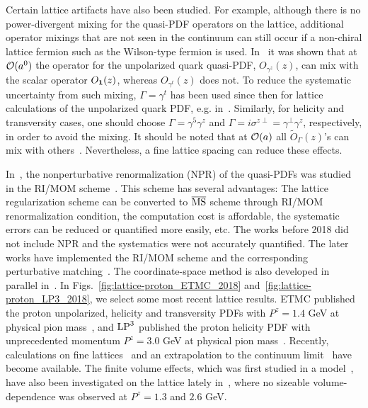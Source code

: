 \documentclass[aps,rmp,reprint,amsmath,amssymb,graphicx,longbibliography]{revtex4-1} %
\begin{document}
Certain lattice artifacts have also been studied. For example, although there is no power-divergent mixing for the quasi-PDF operators on the lattice, additional operator mixings that are not seen in the continuum can still occur if a non-chiral lattice fermion such as the Wilson-type fermion is used.
%
In~\cite{Constantinou:2017sej,Chen:2017mie} it was shown that at ${\cal O}(a^0)$ the operator for the unpolarized quark quasi-PDF, $O_{\gamma^z}(z)$, can mix with the scalar operator $O_{\bf 1}(z)$, whereas $O_{\gamma^t}(z)$ does not.
%
To reduce the systematic uncertainty from such mixing, $\Gamma=\gamma^t$ has been used since then for lattice calculations of the unpolarized quark PDF, e.g. in~\cite{Alexandrou:2017huk,Green:2017xeu,Chen:2017mzz}. Similarly, for helicity and transversity cases, one should choose $\Gamma=\gamma^5\gamma^z$ and $\Gamma=i\sigma^{z\perp}=\gamma^\perp\gamma^z$, respectively, in order to avoid the mixing.
%
It should be noted that at ${\cal O}(a)$ all $\tilde{O}_\Gamma(z)$'s can mix with others~\cite{Chen:2017mie}. Nevertheless, a fine lattice spacing can reduce these effects.

In~\cite{Alexandrou:2017huk,Chen:2017mzz,Green:2017xeu}, the nonperturbative renormalization (NPR) of the quasi-PDFs was studied in the RI/MOM scheme~\cite{Martinelli:1994ty}.
%
This scheme has several advantages: The lattice regularization scheme can be converted to $\overline{\rm MS}$ scheme through RI/MOM renormalization condition,
the computation cost is affordable,
the systematic errors can be reduced or quantified more easily, etc.
%
The works before 2018 did not include NPR and the systematics were not accurately quantified.
%
The later works have implemented the RI/MOM scheme and the corresponding perturbative matching~\cite{Constantinou:2017sej,Stewart:2017tvs,Liu:2018uuj}.
%
The coordinate-space method is also developed in parallel in~\cite{Orginos:2017kos,Cichy:2019ebf,Joo:2019jct,Joo:2020spy,Bhat:2020ktg}.
%
%
In Figs.~\ref{fig:lattice-proton_ETMC_2018} and~\ref{fig:lattice-proton_LP3_2018}, we select some most recent lattice results.
%
ETMC published the proton unpolarized, helicity and transversity PDFs with $P^z=1.4$ GeV at physical pion mass~\cite{Alexandrou:2018pbm,Alexandrou:2018eet}, and ${\rm LP}^3$ published the proton helicity PDF with unprecedented momentum $P^z=3.0$ GeV at physical pion mass~\cite{Lin:2018qky}. Recently, calculations on fine lattices~\cite{Fan:2020nzz,Alexandrou:2020qtt} and an extrapolation to the continuum limit~\cite{Alexandrou:2020qtt} have become available. The finite volume effects, which was first studied in a model~\cite{Briceno:2018lfj}, have also been investigated on the lattice lately in~\cite{Lin:2019ocg}, where no sizeable volume-dependence was observed at $P^z=1.3$ and $2.6$ GeV.
\end{document}

